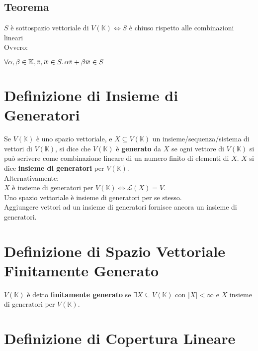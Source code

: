 \documentclass[a4paper, twoside, italian, 11pt]{book}
\newcommand{\card}[1] {\left | #1 \right |}
\newcommand{\overbar}[1] {\mkern 1.5mu\overline{\mkern-1.5mu#1\mkern-1.5mu}\mkern 1.5mu}
\newcommand{\K}{\mathbb K}
\newcommand{\LS}{\mathcal L}
\begin{document}
\subsection{Teorema}

\noindent
$S$ è sottospazio vettoriale di $V(\K) \iff S$ è chiuso rispetto alle combinazioni lineari \\

\noindent
Ovvero:

$\forall \alpha, \beta \in \K, \overbar v, \overbar w \in S \ldotp \alpha \overbar v + \beta \overbar w \in S$




\section{Definizione di Insieme di Generatori}

Se $V(\K)$ è uno spazio vettoriale, e $X \subseteq V(\K)$ un insieme/sequenza/sistema di vettori di $V(\K)$, si dice che $V(\K)$ è \textbf{generato} da $X$ se ogni vettore di $V(\K)$ si può scrivere come combinazione lineare di un numero finito di elementi di $X$. $X$ si dice \textbf{insieme di generatori} per $V(\K)$. \\

\noindent
Alternativamente: \\
$X$ è insieme di generatori per $V(\K) \iff \LS(X) = V$. \\

\noindent
Uno spazio vettoriale è insieme di generatori per se stesso. \\
Aggiungere vettori ad un insieme di generatori fornisce ancora un insieme di generatori.




\section{Definizione di Spazio Vettoriale Finitamente Generato}

$V(\K)$ è detto \textbf{finitamente generato} se $\exists X \subseteq V(\K)$ con $\card X < \infty$ e $X$ insieme di generatori per $V(\K)$.



\section{Definizione di Copertura Lineare}
\end{document}
